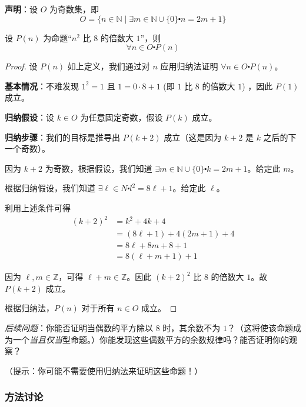 \begin{example}

   \textbf{声明}：设 $O$ 为奇数集，即
   \[O = \{n \in \mathbb{N} \mid \exists m \in \mathbb{N} \cup \{0\} \centerdot n = 2m+1\}\]

   设 $P(n)$ 为命题``$n^2$ 比 $8$ 的倍数大 $1$''，则
   \[\forall n \in O \centerdot P(n)\]

    \begin{proof}
        设 $P(n)$ 如上定义，我们通过对 $n$ 应用归纳法证明 $\forall n \in O \centerdot P(n)$。

        \textbf{基本情况}：不难发现 $1^2=1$ 且 $1=0 \cdot 8 + 1$ (即 $1$ 比 $8$ 的倍数大 $1$) ，因此 $P(1)$ 成立。

        \textbf{归纳假设}：设 $k \in O$ 为任意固定奇数，假设 $P(k)$ 成立。

        \textbf{归纳步骤}：我们的目标是推导出 $P(k+2)$ 成立（这是因为 $k+2$ 是 $k$ 之后的下一个奇数）。

        因为 $k+2$ 为奇数，根据假设，我们知道 $\exists m \in \mathbb{N} \cup \{0\} \centerdot k = 2m+1$。给定此 $m$。

        根据归纳假设，我们知道 $\exists \ell \in N \centerdot l^2=8\ell+1$。给定此 $\ell$。

        利用上述条件可得
        \begin{align*}
            (k + 2)^2 &= k^2 + 4k + 4 \\
            &= (8\ell + 1) + 4(2m + 1) + 4 \\
            &= 8\ell + 8m + 8 + 1 \\
            &= 8(\ell + m + 1) + 1 
        \end{align*}

        因为 $\ell, m \in \mathbb{Z}$，可得 $\ell+m \in \mathbb{Z}$。因此 $(k+2)^2$ 比 $8$ 的倍数大 $1$。故 $P(k + 2)$ 成立。

        根据归纳法，$P(n)$ 对于所有 $n \in O$ 成立。
    \end{proof}
\end{example}

\emph{后续问题}：你能否证明当偶数的平方除以 $8$ 时，其余数不为 $1$？（这将使该命题成为一个\emph{当且仅当}型命题。）你能发现这些偶数平方的余数规律吗？能否证明你的观察？

（提示：你可能不需要使用归纳法来证明这些命题！）

\subsubsection*{方法讨论}


